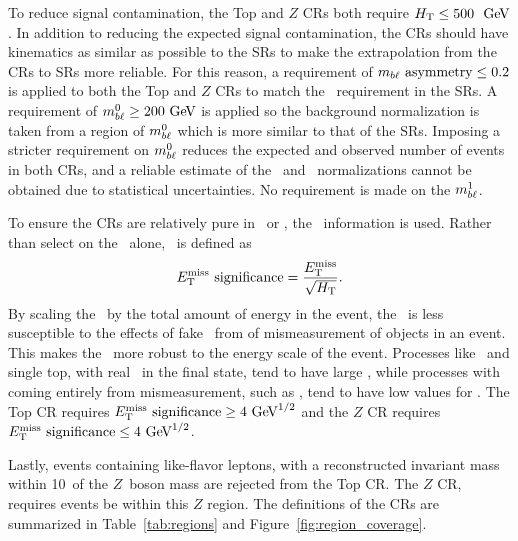 To reduce signal contamination, the Top and $Z$ CRs both require
$\HT \leq 500~\GeV$.
In addition to reducing the expected signal contamination, the CRs should have
kinematics as similar as possible to the SRs to make the extrapolation from the
CRs to SRs more reliable.
For this reason, a requirement of $m_{b\ell}~\mathrm{asymmetry} \leq 0.2$ is applied to both the
Top and $Z$ CRs to match the \MBLASYM\ requirement in the SRs.
A requirement of $\MBL^0 \geq 200 \GeV$ is applied so the background
normalization is taken from a region of $m_{b\ell}^0$ which is more similar to that
of the SRs.
Imposing a stricter requirement on $m_{b\ell}^0$ reduces the expected and observed
number of events in both CRs, and a reliable estimate of the \TTBAR\ and
\ZGAMMAJETS\ normalizations cannot be obtained due to statistical uncertainties.
No requirement is made on the $m_{b\ell}^1$.

To ensure the CRs are relatively pure in \TTBAR\ or \ZGAMMAJETS, the
\MET\ information is used.
Rather than select on the \MET\ alone, \METSIG\ is defined as
\begin{equation}
  E_{\mathrm{T}}^{\mathrm{miss}}~\text{significance} = \frac{E_{\mathrm{T}}^{\mathrm{miss}}}{\sqrt{H_{\mathrm{T}}}}.
\end{equation}
By scaling the \MET\ by the total amount of energy in the event, the
\METSIG\ is less susceptible to the effects of fake \MET\ from of mismeasurement
of objects in an event.
This makes the \METSIG\ more robust to the energy scale of the event.
Processes like \TTBAR\ and single top, with real \MET\ in the final state, tend
to have large \METSIG, while processes with \MET coming entirely from
mismeasurement, such as \ZGAMMAJETS, tend to have low values for \METSIG.
The Top CR requires $\METSIG \geq 4 \GeV^{1/2}$
and the $Z$ CR requires $\METSIG \leq 4 \GeV^{1/2}$.

Lastly, events containing like-flavor leptons, with a reconstructed invariant
mass within 10~\GeV of the $Z$~boson mass are rejected from the Top CR.
The $Z$ CR, requires events be within this $Z$ region.
The definitions of the CRs are summarized in Table~\ref{tab:regions} and
Figure~\ref{fig:region_coverage}.


